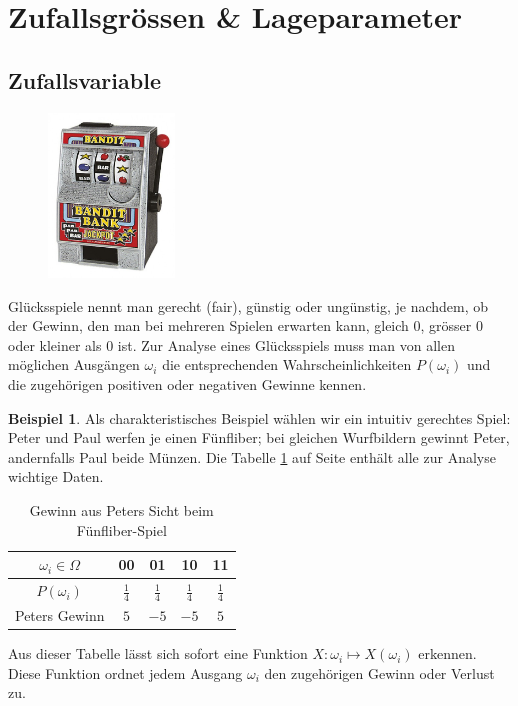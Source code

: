 \documentclass[%
<<<<<<< Updated upstream
<<<<<<< Updated upstream
11pt,%
twoside,%
titlepage,%
german,%
=======
=======
>>>>>>> Stashed changes
11pt,%
twoside,%
titlepage,%
swissgerman,%
<<<<<<< Updated upstream
>>>>>>> Stashed changes
=======
>>>>>>> Stashed changes
headsepline%
]{scrartcl}
\newcommand{\spaltenheight}{\rule{0mm}{3ex}}
\newcommand{\spaltensep}{\\[1ex]}
\theoremstyle{definition}
\newtheorem{bsp}{Beispiel}[subsection] %
\theoremstyle{plain}
\newcounter{theo}[section]\setcounter{theo}{0}
\begin{document}
\clearpage

\section{Zufallsgrössen \& Lageparameter}

\subsection{Zufallsvariable}
\begin{figure}
  \begin{center}
    \includegraphics[width=0.3\textwidth]{pictures/bandit}
  \end{center}
\end{figure}
Glücksspiele nennt man gerecht (fair), günstig oder ungünstig, je nachdem, ob der Gewinn, den man bei mehreren Spielen erwarten kann, gleich $0$, grösser $0$ oder kleiner als $0$ ist. Zur Analyse eines Glücksspiels muss man von allen möglichen Ausgängen $\omega_i$ die entsprechenden Wahrscheinlichkeiten $P(\omega_i)$ und die zugehörigen positiven oder negativen Gewinne kennen.

\begin{bsp}
Als charakteristisches Beispiel wählen wir ein intuitiv gerechtes Spiel: Peter und Paul werfen je einen Fünfliber; bei gleichen Wurfbildern gewinnt Peter, andernfalls Paul beide Münzen.
Die Tabelle \ref{tab:5liber} auf Seite \pageref{tab:5liber} enthält alle zur Analyse wichtige Daten.

\begin{table}
\begin{center}
\begin{tabular}{|c|c|c|c|c|}
\hline
\rowcolor{Gray}\spaltenheight $\omega_i\in\Omega$ & 00 & 01 & 10 & 11\spaltensep \hline
\rowcolor{lightyellow}\spaltenheight $P(\omega_i)$ & $\frac{1}{4}$ & $\frac{1}{4}$ & $\frac{1}{4}$ & $\frac{1}{4}$\spaltensep \hline
\rowcolor{Gray}\spaltenheight Peters Gewinn & $5$ & $-5$ & $-5$ & $5$\spaltensep \hline
\end{tabular}
\end{center}
\caption{Gewinn aus Peters Sicht beim Fünfliber-Spiel}\label{tab:5liber}
\end{table}
\end{bsp}
Aus dieser Tabelle lässt sich sofort eine Funktion $X:\omega_i\mapsto X(\omega_i)$
erkennen. Diese Funktion ordnet jedem Ausgang $\omega_i$ den zugehörigen Gewinn oder Verlust zu.
\end{document}
